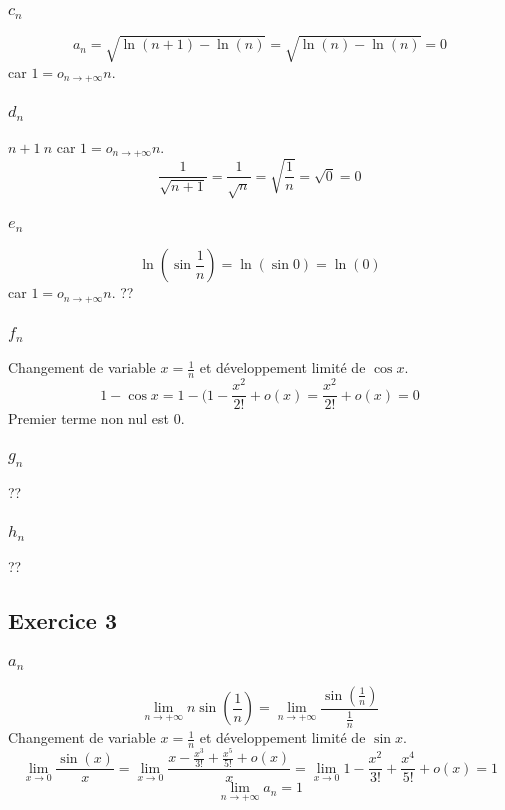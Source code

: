 \documentclass[]{book}
\theoremstyle{definition}
\begin{document}
\subsubsection*{$c_n$}
$$a_n = \sqrt{\ln(n+1)-\ln(n)} = \sqrt{\ln(n)-\ln(n)} = 0$$
car $1 = o_{n \to +\infty}n$.

\subsubsection*{$d_n$}
$n+1 ~ n$ car $1 = o_{n \to +\infty}n$.
$$\frac{1}{\sqrt{n+1}} = \frac{1}{\sqrt{n}} = \sqrt{\frac{1}{n}} = \sqrt{0} = 0$$

\subsubsection*{$e_n$}
$$\ln \left( \sin \frac{1}{n} \right) = \ln \left( \sin 0 \right) = \ln(0)$$
car $1 = o_{n \to +\infty}n$.
??

\subsubsection*{$f_n$}
Changement de variable $x=\frac{1}{n}$ et d\'eveloppement limit\'e de $\cos x$.
$$1-\cos x = 1 - (1-\frac{x^2}{2!}+o(x) = \frac{x^2}{2!}+o(x) = 0$$
Premier terme non nul est 0.

\subsubsection*{$g_n$}
??

\subsubsection*{$h_n$}
??

\subsection*{Exercice 3}
\subsubsection*{$a_n$}
$$\lim_{n \to +\infty} n \sin(\frac{1}{n}) = \lim_{n \to +\infty} \frac{\sin(\frac{1}{n})}{\frac{1}{n}}$$
Changement de variable $x=\frac{1}{n}$ et d\'eveloppement limit\'e de $\sin x$.
$$\lim_{x \to 0} \frac{\sin(x)}{x} = \lim_{x \to 0} \frac{x-\frac{x^3}{3!}+\frac{x^5}{5!}+o(x)}{x} = \lim_{x \to 0}{1-\frac{x^2}{3!}+\frac{x^4}{5!}+o(x)} = 1$$
$$\lim_{n \to +\infty} a_n = 1$$
\end{document}
